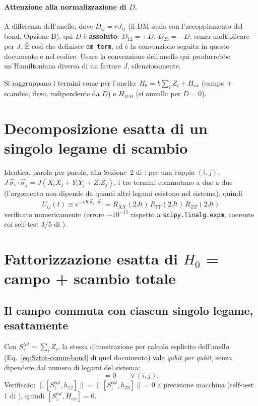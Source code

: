 \documentclass[11pt,a4paper]{article}
\begin{document}
\paragraph{Attenzione alla normalizzazione di $D$.} A differenza dell'anello, dove $D_{ij}=rJ_{ij}$ (il DM scala con l'accoppiamento del bond, Opzione B), qui $D$ è \textbf{assoluto}: $D_{12}=+D$, $D_{23}=-D$, senza moltiplicare per $J$. È così che \texttt{} definisce \texttt{dm\_term}, ed è la convenzione seguita in questo documento e nel codice. Usare la convenzione dell'anello qui produrrebbe un'Hamiltoniana diversa di un fattore $J$, silenziosamente.

Si raggruppano i termini come per l'anello: $H_0=b\sum_iZ_i+H_{ex}$ (campo + scambio, fisso, indipendente da $D$) e $H_{DM}$ (si annulla per $D=0$).

\section{Decomposizione esatta di un singolo legame di scambio}
\label{sec:bond-exact}

Identica, parola per parola, alla Sezione~2 di \texttt{}: per una coppia $(i,j)$, $J\,\vec\sigma_i\cdot\vec\sigma_j=J(X_iX_j+Y_iY_j+Z_iZ_j)$, i tre termini commutano a due a due (l'argomento non dipende da quanti altri legami esistono nel sistema), quindi
\begin{equation}
\boxed{U_{ij}(t) \equiv e^{-iJt\,\vec\sigma_i\cdot\vec\sigma_j} = R_{XX}(2Jt)\,R_{YY}(2Jt)\,R_{ZZ}(2Jt)}
\label{eq:Uij-gates}
\end{equation}
verificato numericamente (errore $\sim10^{-15}$ rispetto a \texttt{scipy.linalg.expm}, coerente coi self-test 3/5 di \texttt{}).

\section{Fattorizzazione esatta di $H_0$ = campo + scambio totale}
\label{sec:H0-fact}

\subsection{Il campo commuta con ciascun singolo legame, esattamente}

Con $S_z^{tot}=\sum_iZ_i$, la stessa dimostrazione per calcolo esplicito dell'anello (Eq.~\eqref{eq:Sztot-comm-bond} di quel documento) vale \emph{qubit per qubit}, senza dipendere dal numero di legami del sistema:
\begin{equation}
[S_z^{tot},\,\vec\sigma_i\cdot\vec\sigma_j] = 0 \qquad \forall\,(i,j).
\label{eq:Sztot-comm-bond}
\end{equation}
Verificato: $\|[S_z^{tot},h_{12}]\|=\|[S_z^{tot},h_{23}]\|=0$ a precisione macchina (self-test 1 di \texttt{}), quindi $[S_z^{tot},H_{ex}]=0$.
\end{document}
